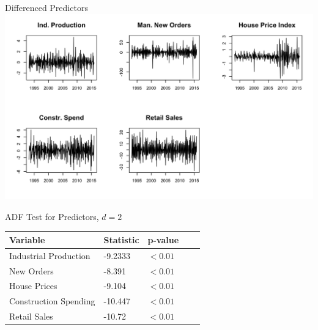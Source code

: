 \documentclass[ignorenonframetext]{beamer}
\begin{document}
  	\begin{frame}{Differenced Predictors}
		\includegraphics[width=\linewidth]{images/StationaryPred}
  	\end{frame}
 
  	\begin{frame}{ADF Test for Predictors, \(d=2\)}
\begin{table}[htb]
		 \centering
		 \begin{tabular}{lllll}
		 \hline
		 \textbf{Variable} & \textbf{Statistic}  & \textbf{p-value}\\ \hline
		  Industrial Production & -9.2333  &\( < 0.01\)\\
		  New Orders &  -8.391  & \( < 0.01\)\\			  
		  House Prices &  -9.104  & \( < 0.01\)\\				  
		  Construction Spending &  -10.447 &  \( < 0.01\)\\
		  Retail Sales &  -10.72 &  \( < 0.01\)\\ \hline
		 \end{tabular}
		 \end{table}
  	\end{frame}
 
\end{document}
